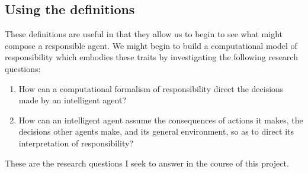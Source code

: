 \subsection{Using the definitions}
These definitions are useful in that they allow us to begin to see what might compose a responsible agent. We might begin to build a computational model of responsibility which embodies these traits by investigating the following research questions:
\begin{enumerate}
    \item How can a computational formalism of responsibility direct the decisions made by an intelligent agent?
    \item How can an intelligent agent assume the consequences of actions it makes, the decisions other agents make, and its general environment, so as to direct its interpretation of responsibility?
\end{enumerate}\par

These are the research questions I seek to answer in the course of this project.
